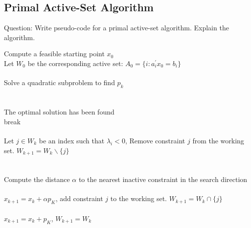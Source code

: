 \subsection{\bfseries Primal Active-Set Algorithm}
\begin{shaded}
{Question: Write pseudo-code for a primal active-set algorithm. Explain the algorithm.}
\end{shaded}
\begin{algorithm}[H]
	\caption{Primal Active-Set Algorithm}
	\begin{algorithmic}[1]
	    \STATE Compute a feasible starting point $x_0$\\
		\STATE Let $W_0$ be the corresponding active set: $A_0=\{ i:a_i^{\prime}x_0=b_i \}$\\
		\\
		\STATE Solve a quadratic subproblem to find $p_k$\\
		\\
		\\
		\STATE The optimal solution has been found\\
		\STATE break\\
		\ELSE\\
		\STATE Let $j \in W_k$ be an index such that $\lambda_i<0$, Remove constraint $j$ from the working set. $W_{k+1}=W_k \backslash \{j\}$\\
		\ENDIF\\
		\ELSE\\
		\STATE Compute the distance $\alpha$ to the nearest inactive constraint in the search direction\\
		\\
		\STATE $x_{k+1}=x_k+\alpha p_K$, add constraint $j$ to the working set. $W_{k+1}=W_k \cap \{ j \}$\\
		\ELSE\\
		\STATE $x_{k+1}=x_k+ p_K$, $W_{k+1}=W_k$\\
		\ENDIF\\
		\ENDIF\\
		\ENDWHILE
    \end{algorithmic}
\end{algorithm}

